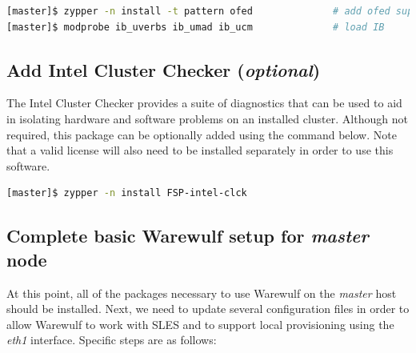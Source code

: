 \documentclass[letterpaper]{article}
\begin{document}
\begin{lstlisting}[language=bash,keywords={}]
[master]$ zypper -n install -t pattern ofed              # add ofed support
[master]$ modprobe ib_uverbs ib_umad ib_ucm              # load IB 
\end{lstlisting}

\subsection{Add Intel Cluster Checker ({\em optional})} \label{sec:add_clck}

The Intel Cluster Checker provides a suite of diagnostics that can be used to
aid in isolating hardware and software problems on an installed
cluster. Although not required, this package can be optionally added using the
command below. Note that a valid license will also need to be installed
separately in order to use this software.

\begin{lstlisting}[language=bash,keywords={}]
[master]$ zypper -n install FSP-intel-clck
\end{lstlisting}


\subsection{Complete basic Warewulf setup for {\em master} node}

At this point, all of the packages necessary to use Warewulf on the {\em
  master} host should be installed.  Next, we need to update several
configuration files in order to allow Warewulf to work with SLES and to support
local provisioning using the {\em eth1} interface.  Specific steps are as
follows:

\end{document}
